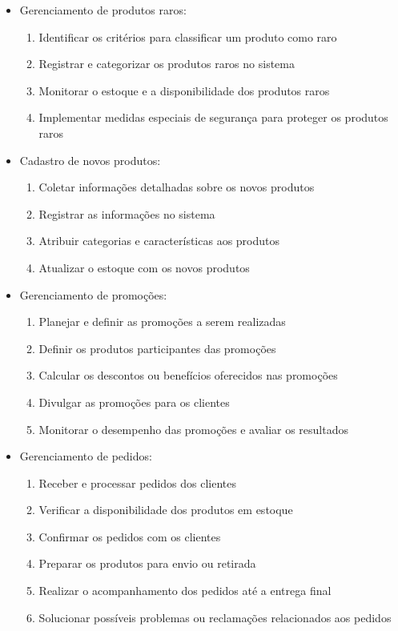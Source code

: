 \documentclass[
	12pt,				%
	openright,			%
	twoside,			%
	a4paper,			%
	english,			%
	brazil				%
	]{abntex2}
\begin{document}
\begin{itemize}
    \item Gerenciamento de produtos raros:
    \begin{enumerate}
        \item Identificar os critérios para classificar um produto como raro
        \item Registrar e categorizar os produtos raros no sistema
        \item Monitorar o estoque e a disponibilidade dos produtos raros
        \item Implementar medidas especiais de segurança para proteger os produtos raros
    \end{enumerate}
    
    \item Cadastro de novos produtos:
    \begin{enumerate}
        \item Coletar informações detalhadas sobre os novos produtos
        \item Registrar as informações no sistema
        \item Atribuir categorias e características aos produtos
        \item Atualizar o estoque com os novos produtos
    \end{enumerate}
    
    \item Gerenciamento de promoções:
    \begin{enumerate}
        \item Planejar e definir as promoções a serem realizadas
        \item Definir os produtos participantes das promoções
        \item Calcular os descontos ou benefícios oferecidos nas promoções
        \item Divulgar as promoções para os clientes
        \item Monitorar o desempenho das promoções e avaliar os resultados
    \end{enumerate}
    
    \item Gerenciamento de pedidos:
    \begin{enumerate}
        \item Receber e processar pedidos dos clientes
        \item Verificar a disponibilidade dos produtos em estoque
        \item Confirmar os pedidos com os clientes
        \item Preparar os produtos para envio ou retirada
        \item Realizar o acompanhamento dos pedidos até a entrega final
        \item Solucionar possíveis problemas ou reclamações relacionados aos pedidos
    \end{enumerate}
\end{itemize}
\end{document}
